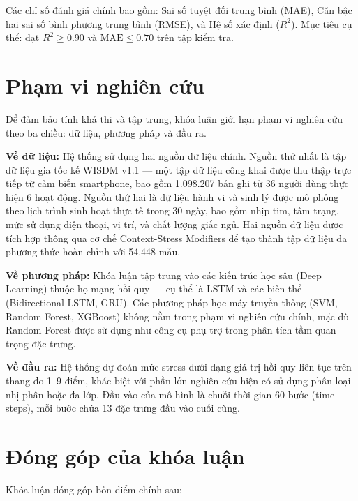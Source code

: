 Các chỉ số đánh giá chính bao gồm: Sai số tuyệt đối trung bình (MAE), Căn bậc hai sai số bình phương trung bình (RMSE), và Hệ số xác định ($R^2$). Mục tiêu cụ thể: đạt $R^2 \geq 0.90$ và $\text{MAE} \leq 0.70$ trên tập kiểm tra.


\section{Phạm vi nghiên cứu}
\label{sec:pham_vi}

Để đảm bảo tính khả thi và tập trung, khóa luận giới hạn phạm vi nghiên cứu theo ba chiều: dữ liệu, phương pháp và đầu ra.

\textbf{Về dữ liệu:} Hệ thống sử dụng hai nguồn dữ liệu chính. Nguồn thứ nhất là tập dữ liệu gia tốc kế WISDM v1.1 — một tập dữ liệu công khai được thu thập trực tiếp từ cảm biến smartphone, bao gồm 1.098.207 bản ghi từ 36 người dùng thực hiện 6 hoạt động. Nguồn thứ hai là dữ liệu hành vi và sinh lý được mô phỏng theo lịch trình sinh hoạt thực tế trong 30 ngày, bao gồm nhịp tim, tâm trạng, mức sử dụng điện thoại, vị trí, và chất lượng giấc ngủ. Hai nguồn dữ liệu được tích hợp thông qua cơ chế Context-Stress Modifiers để tạo thành tập dữ liệu đa phương thức hoàn chỉnh với 54.448 mẫu.

\textbf{Về phương pháp:} Khóa luận tập trung vào các kiến trúc học sâu (Deep Learning) thuộc họ mạng hồi quy — cụ thể là LSTM và các biến thể (Bidirectional LSTM, GRU). Các phương pháp học máy truyền thống (SVM, Random Forest, XGBoost) không nằm trong phạm vi nghiên cứu chính, mặc dù Random Forest được sử dụng như công cụ phụ trợ trong phân tích tầm quan trọng đặc trưng.

\textbf{Về đầu ra:} Hệ thống dự đoán mức stress dưới dạng giá trị hồi quy liên tục trên thang đo 1--9 điểm, khác biệt với phần lớn nghiên cứu hiện có sử dụng phân loại nhị phân hoặc đa lớp. Đầu vào của mô hình là chuỗi thời gian 60 bước (time steps), mỗi bước chứa 13 đặc trưng đầu vào cuối cùng.


\section{Đóng góp của khóa luận}
\label{sec:dong_gop}

Khóa luận đóng góp bốn điểm chính sau:

